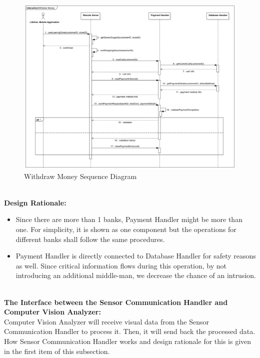 \documentclass[11pt]{article}
\begin{document}
    \begin{center}
        \begin{figure}[H]
            \includegraphics[width=\linewidth]{Images/WithdrawMoneySeq.png}  %
            \caption{Withdraw Money Sequence Diagram}
            \label{wdMoney}
        \end{figure}
    \end{center}
    
    \textbf{\\Design Rationale:}
    \begin{itemize}
       \item Since there are more than 1 banks, Payment Handler might be more than one. For simplicity, it is shown as one component but the operations for different banks 
       shall follow the same procedures. 
       \item Payment Handler is directly connected to Database Handler for safety reasons as well. Since critical information flows during this operation, 
       by not introducing an additional middle-man, we decrease the chance of an intrusion. 
    \end{itemize}
    
    $$ $$
    \textbf{\\The Interface between the Sensor Communication Handler and Computer Vision Analyzer:\\}
    Computer Vision Analyzer will receive visual data from the Sensor Communication Handler to process it. Then, it will send back the processed data. How Sensor 
    Communication Handler works and design rationale for this is given in the first item of this subsection. 
    
\end{document}
